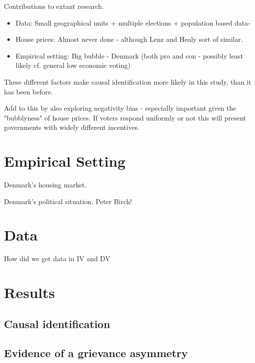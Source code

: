 \documentclass[12pt,a4paper]{article}
\begin{document}
Contributions to extant research.
\begin{itemize}
	\item Data: Small geographical units + multiple elections + population based data-
	\item House prices: Almost never done - although Lenz and Healy sort of similar.
	\item Empirical setting: Big bubble - Denmark (both pro and con - possibly least likely cf. general low economic voting)
\end{itemize}

These different factors make causal identification more likely in this study, than it has been before. 

Add to this by also exploring negativity bias - especially important given the "bubblyness" of house prices. If voters respond uniformly or not this will present governments with widely different incentives. 



\section{Empirical Setting}

Denmark's housing market.

Denmark's political situation.
Peter Birch!


\section{Data}

How did we get data in IV and DV

\section{Results}



\subsection{Causal identification}





\subsection{Evidence of a grievance asymmetry}
\end{document}
